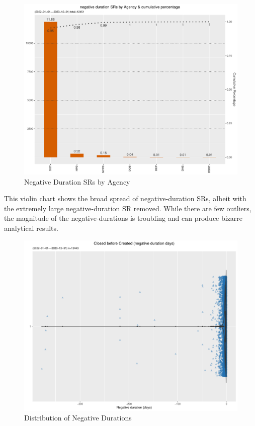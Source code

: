 \documentclass[12pt, titlepage]{article}
\begin{document}
\begin{figure}[tbp]
 	 \centering
 	 \includegraphics[width = \textwidth]{negative_duration_SR_barchart.pdf}
	  \caption{Negative Duration SRs by Agency}
	  \label{fig:negative-duration}
\end{figure}
	
This violin chart shows the broad spread of negative-duration SRs, albeit with 
the extremely large negative-duration SR removed. While there are few 
outliers, the magnitude of the negative-durations is troubling and can 
produce bizarre analytical results.
	
\begin{figure}[tbp]
 	 \centering
 	 \includegraphics[width = \textwidth]{negative_duration_SR_violin.pdf}
	 \caption{Distribution of Negative Durations}
	 \label{fig:negative-duration-violin}
\end{figure}
\end{document}
